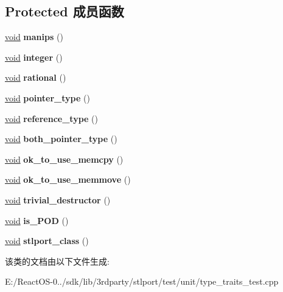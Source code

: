 \subsection*{Protected 成员函数}
\begin{DoxyCompactItemize}
\item 
\mbox{\label{class_type_traits_test_a7d31905ae86012d87bc19bbafe5df181}} 
\hyperlink{interfacevoid}{void} {\bfseries manips} ()
\item 
\mbox{\label{class_type_traits_test_afedd8e349082c80f7f310c597b28fdda}} 
\hyperlink{interfacevoid}{void} {\bfseries integer} ()
\item 
\mbox{\label{class_type_traits_test_ac5d8ef639de7c55f664b6b8349cdda1b}} 
\hyperlink{interfacevoid}{void} {\bfseries rational} ()
\item 
\mbox{\label{class_type_traits_test_a49d5f1480a9cc93c1830a34a1be86da9}} 
\hyperlink{interfacevoid}{void} {\bfseries pointer\+\_\+type} ()
\item 
\mbox{\label{class_type_traits_test_a43664b41c036071caa7c314b1c21a5d4}} 
\hyperlink{interfacevoid}{void} {\bfseries reference\+\_\+type} ()
\item 
\mbox{\label{class_type_traits_test_ae48a72bdc197d4aa4bb4ba1bbddb5c54}} 
\hyperlink{interfacevoid}{void} {\bfseries both\+\_\+pointer\+\_\+type} ()
\item 
\mbox{\label{class_type_traits_test_aa698312ac78b99a0b2c353ded2b6f5d6}} 
\hyperlink{interfacevoid}{void} {\bfseries ok\+\_\+to\+\_\+use\+\_\+memcpy} ()
\item 
\mbox{\label{class_type_traits_test_ac248b50b0fb68ea411a6e5a2437ab910}} 
\hyperlink{interfacevoid}{void} {\bfseries ok\+\_\+to\+\_\+use\+\_\+memmove} ()
\item 
\mbox{\label{class_type_traits_test_a1b305e116c34f1ab941e259581f88bb4}} 
\hyperlink{interfacevoid}{void} {\bfseries trivial\+\_\+destructor} ()
\item 
\mbox{\label{class_type_traits_test_a4ca887615c63d9a5b9fd1feffd6ae8c3}} 
\hyperlink{interfacevoid}{void} {\bfseries is\+\_\+\+P\+OD} ()
\item 
\mbox{\label{class_type_traits_test_af221fde06c884970d62964a0a33cc313}} 
\hyperlink{interfacevoid}{void} {\bfseries stlport\+\_\+class} ()
\end{DoxyCompactItemize}


该类的文档由以下文件生成\+:\begin{DoxyCompactItemize}
\item 
E\+:/\+React\+O\+S-\/0../sdk/lib/3rdparty/stlport/test/unit/type\+\_\+traits\+\_\+test.\+cpp\end{DoxyCompactItemize}
